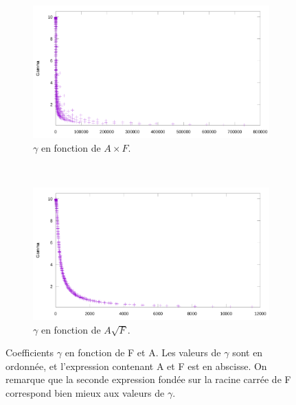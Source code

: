 	\clearpage %
	\begin{figure}[!htb]
		\centering
		\begin{subfigure}[t]{\textwidth}
			\centering
			\includegraphics[width=\textwidth]{figures/ch4/afVgamma}
			\caption{$\gamma$ en fonction de $A\times{}F$.}
			\label{fig:gammaAF}
		\end{subfigure}
		~
		\begin{subfigure}[t]{\textwidth}
			\centering
			\includegraphics[width=\textwidth]{figures/ch4/asqrtFVgamma}
			\caption{$\gamma$ en fonction de $A\sqrt{F}$.}
			\label{fig:gammaASQRTF}
		\end{subfigure}
		\caption[Coefficients $\gamma$ en fonction de F et A, bis]{Coefficients $\gamma$ en fonction de F et A. Les valeurs de $\gamma$ sont en ordonnée, et l'expression contenant A et F est en abscisse. On remarque que la seconde expression fondée sur la racine carrée de F correspond bien mieux aux valeurs de $\gamma$.}
		\label{fig:gammaVentropy}
	\end{figure}

